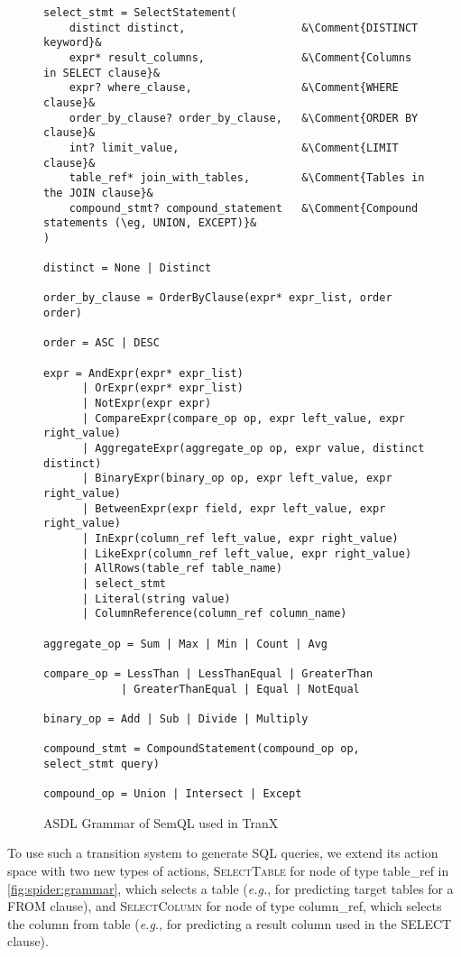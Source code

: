 \documentclass[11pt,a4paper]{article}
\renewcommand{\tt}[1]{\fontfamily{cmtt}\selectfont #1}
\newcommand{\eg}{\hbox{\emph{e.g.}}\xspace}
\begin{document}
\begin{figure}[t]
    \centering
    \begin{lstlisting}
select_stmt = SelectStatement(
    distinct distinct,                  &\Comment{DISTINCT keyword}&
    expr* result_columns,               &\Comment{Columns in SELECT clause}&
    expr? where_clause,                 &\Comment{WHERE clause}&
    order_by_clause? order_by_clause,   &\Comment{ORDER BY clause}&
    int? limit_value,                   &\Comment{LIMIT clause}&
    table_ref* join_with_tables,        &\Comment{Tables in the JOIN clause}&
    compound_stmt? compound_statement   &\Comment{Compound statements (\eg, UNION, EXCEPT)}&
)

distinct = None | Distinct

order_by_clause = OrderByClause(expr* expr_list, order order)

order = ASC | DESC

expr = AndExpr(expr* expr_list)
      | OrExpr(expr* expr_list)
      | NotExpr(expr expr)
      | CompareExpr(compare_op op, expr left_value, expr right_value)
      | AggregateExpr(aggregate_op op, expr value, distinct distinct)
      | BinaryExpr(binary_op op, expr left_value, expr right_value)
      | BetweenExpr(expr field, expr left_value, expr right_value)
      | InExpr(column_ref left_value, expr right_value)
      | LikeExpr(column_ref left_value, expr right_value)
      | AllRows(table_ref table_name)
      | select_stmt
      | Literal(string value)
      | ColumnReference(column_ref column_name)

aggregate_op = Sum | Max | Min | Count | Avg

compare_op = LessThan | LessThanEqual | GreaterThan 
            | GreaterThanEqual | Equal | NotEqual

binary_op = Add | Sub | Divide | Multiply

compound_stmt = CompoundStatement(compound_op op, select_stmt query)

compound_op = Union | Intersect | Except
\end{lstlisting}
    \caption{ASDL Grammar of SemQL used in TranX}
    \label{fig:spider:grammar}
\end{figure}

To use such a transition system to generate SQL queries, we extend its action space with two new types of actions, \textsc{SelectTable} for node of type {\tt table\_ref} in \autoref{fig:spider:grammar}, which selects a table  (\eg, for predicting target tables for a {\tt FROM} clause), and \textsc{SelectColumn} for node of type {\tt column\_ref}, which selects the column  from table  (\eg, for predicting a result column used in the {\tt SELECT} clause).
\end{document}
